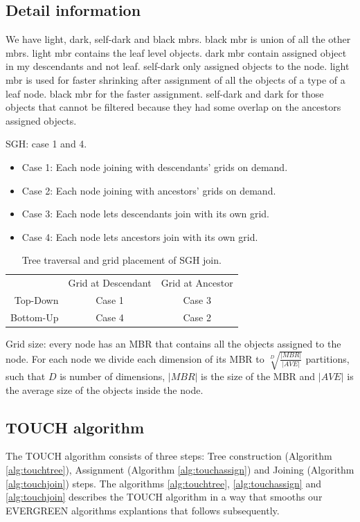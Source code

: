 \documentclass{vldb}
\newcommand{\SJ}{TOUCH}
\newcommand{\newSJ}{EVERGREEN}
\begin{document}
\subsection{Detail information}
We have light, dark, self-dark and black mbrs. black mbr is union of all the other mbrs. light mbr contains the leaf level objects. dark mbr contain assigned object in my descendants and not leaf. self-dark only assigned objects to the node. light mbr is used for faster shrinking after assignment of all the objects of a type of a leaf node. black mbr for the faster assignment. self-dark and dark for those objects that cannot be filtered because they had some overlap on the ancestors assigned objects.


SGH: case 1 and 4.
\begin{itemize}
\item Case 1: Each node joining with descendants' grids on demand.
\item Case 2: Each node joining with ancestors' grids on demand.
\item Case 3: Each node lets descendants join with its own grid.
\item Case 4: Each node lets ancestors join with its own grid.
\end{itemize}


\begin{table}
\centering
\begin{tabular}{ r|c|c| }
\multicolumn{1}{r}{} & Grid at Descendant & \multicolumn{1}{c}{Grid at Ancestor} \\
\cline{2-3}
Top-Down & Case 1 & Case 3 \\
\cline{1-3}
Bottom-Up & Case 4 & Case 2 \\
\cline{2-3}
\end{tabular}
\caption{Tree traversal and grid placement of SGH join.}
\label{table:SGH}
\end{table}


Grid size: every node has an MBR that contains all the objects assigned to the node. For each node we divide each dimension of its MBR to $\sqrt[D]{\frac{|MBR|}{|AVE|}}$ partitions, such that $D$ is number of dimensions, $|MBR|$ is the size of the MBR and $|AVE|$ is the average size of the objects inside the node.

\subsection{{\SJ} algorithm}
The {\SJ} algorithm consists of three steps: Tree construction (Algorithm \ref{alg:touchtree}), Assignment (Algorithm \ref{alg:touchassign}) and Joining (Algorithm \ref{alg:touchjoin}) steps. The algorithms \ref{alg:touchtree}, \ref{alg:touchassign} and \ref{alg:touchjoin} describes the {\SJ} algorithm in a way that smooths our {\newSJ} algorithms explantions that follows subsequently.
\end{document}
